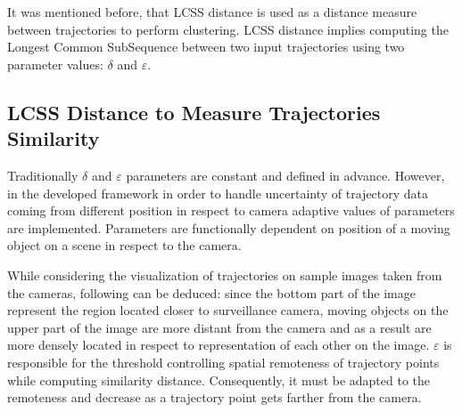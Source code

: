 It was mentioned before, that LCSS distance is used as a distance measure between trajectories to perform clustering. LCSS distance implies computing the Longest Common SubSequence between two input trajectories using two parameter values: $\delta$ and $\varepsilon$. 

\subsection{LCSS Distance to Measure Trajectories Similarity}

Traditionally $\delta$ and $\varepsilon$ parameters are constant and defined in advance. However, in the developed framework in order to handle uncertainty of trajectory data coming from different position in respect to camera adaptive values of parameters are implemented. Parameters are functionally dependent on position of a moving object on a scene in respect to the camera. 

While considering the visualization of trajectories on sample images taken from the cameras, following can be deduced: since the bottom part of the image represent the region located closer to surveillance camera, moving objects on the upper part of the image are more distant from the camera and as a result are more densely located in respect to representation of each other on the image. $\varepsilon$ is responsible for the threshold controlling spatial remoteness of trajectory points while computing similarity distance. Consequently, it must be adapted to the remoteness and decrease as a trajectory point gets farther from the camera.

